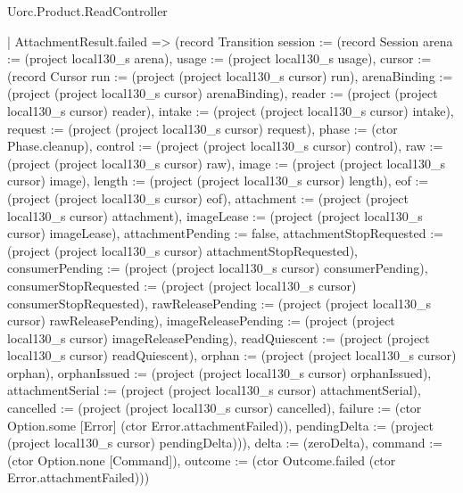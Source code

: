 \begin{lexlean}{Uorc.Product.ReadController}
\begin{semanticmodule}
{      | AttachmentResult.failed => (record Transition {session := (record Session {arena := (project local130_s arena), usage := (project local130_s usage), cursor := (record Cursor {run := (project (project local130_s cursor) run), arenaBinding := (project (project local130_s cursor) arenaBinding), reader := (project (project local130_s cursor) reader), intake := (project (project local130_s cursor) intake), request := (project (project local130_s cursor) request), phase := (ctor Phase.cleanup), control := (project (project local130_s cursor) control), raw := (project (project local130_s cursor) raw), image := (project (project local130_s cursor) image), length := (project (project local130_s cursor) length), eof := (project (project local130_s cursor) eof), attachment := (project (project local130_s cursor) attachment), imageLease := (project (project local130_s cursor) imageLease), attachmentPending := false, attachmentStopRequested := (project (project local130_s cursor) attachmentStopRequested), consumerPending := (project (project local130_s cursor) consumerPending), consumerStopRequested := (project (project local130_s cursor) consumerStopRequested), rawReleasePending := (project (project local130_s cursor) rawReleasePending), imageReleasePending := (project (project local130_s cursor) imageReleasePending), readQuiescent := (project (project local130_s cursor) readQuiescent), orphan := (project (project local130_s cursor) orphan), orphanIssued := (project (project local130_s cursor) orphanIssued), attachmentSerial := (project (project local130_s cursor) attachmentSerial), cancelled := (project (project local130_s cursor) cancelled), failure := (ctor Option.some [Error] (ctor Error.attachmentFailed)), pendingDelta := (project (project local130_s cursor) pendingDelta)})}), delta := (zeroDelta), command := (ctor Option.none [Command]), outcome := (ctor Outcome.failed (ctor Error.attachmentFailed))})
}
\end{semanticmodule}
\end{lexlean}
